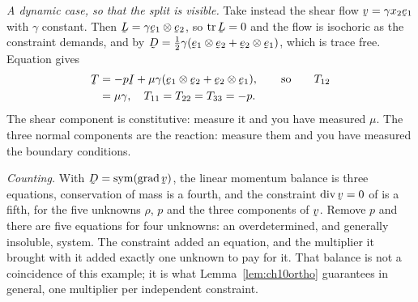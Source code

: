 \begin{example}
\emph{A dynamic case, so that the split is visible.} Take instead the
shear flow $\bv=\gamma x_{2}\be_{1}$ with $\gamma$ constant. Then
$\bL=\gamma\be_{1}\otimes\be_{2}$, so $\tr\bL=0$ and the flow is
isochoric as the constraint demands, and by 
$\bD=\tfrac12\gamma(\be_{1}\otimes\be_{2}+\be_{2}\otimes\be_{1})$, which
is trace free. Equation  gives
\[
\begin{aligned}
   \bT&=-p\I+\mu\gamma(\be_{1}\otimes\be_{2}+\be_{2}\otimes\be_{1}),
   \qquad\text{so}\qquad
   T_{12}\\
   &=\mu\gamma,\quad T_{11}=T_{22}=T_{33}=-p .
\end{aligned}
\]
The shear component is constitutive: measure it and you have measured
$\mu$. The three normal components are the reaction: measure them and you
have measured the boundary conditions.

\emph{Counting.} With $\bD=\Sym(\grad\bv)$, the linear momentum balance
is three equations, conservation of mass  is a fourth, and the
constraint $\dvg\bv=0$ of  is a fifth, for the five unknowns
$\rho$, $p$ and the three components of $\bv$. Remove $p$ and there are
five equations for four unknowns: an overdetermined, and generally
insoluble, system. The constraint added an equation, and the multiplier
it brought with it added exactly one unknown to pay for it. That balance
is not a coincidence of this example; it is what Lemma~\ref{lem:ch10ortho}
guarantees in general, one multiplier per independent constraint.
\end{example}

